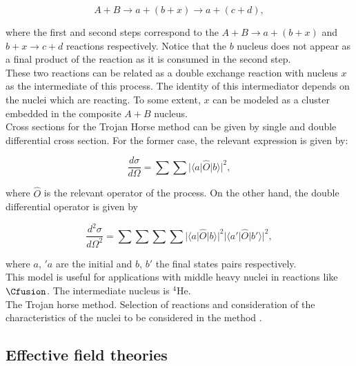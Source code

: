 \documentclass[openany]{book}
\begin{document}
\begin{equation}\label{eq: special_trojanHorse_reaction}
	A + B \rightarrow a + (b + x)\rightarrow a + (c + d),
\end{equation}

where the first and second steps correspond to the $A + B \rightarrow a + (b + x)$ and $b + x \rightarrow c + d$ reactions respectively. Notice that the $b$ nucleus does not appear as a final product of the reaction as it is consumed in the second step. \\

These two reactions can be related as a double exchange reaction with nucleus $x$ as the intermediate of this process. The identity of this intermediator depends on the nuclei which are reacting. To some extent, $x$ can be modeled as a cluster embedded in the composite $A + B$ nucleus. \\ 

Cross sections for the Trojan Horse method can be given by single and double differential cross section. For the former case, the relevant expression is given by: 

\begin{equation}\label{eq: special_differential_single}
	\frac{d\sigma}{d\Omega} = \sum \sum |\langle a | \hat O | b  \rangle|^2,
\end{equation}

where $\hat O$ is the relevant operator of the process. On the other hand, the double differential operator is given by 

\begin{equation}\label{eq: special_differential_double}
	\frac{d^2\sigma}{d\Omega^2} = \sum \sum \sum \sum  |\langle a | \hat O | b \rangle|^2 |\langle a' | \hat O | b' \rangle|^2,
\end{equation}

where $a$, $'a$ are the initial and $b$, $b'$ the final states pairs respectively. \\

This model is useful for applications with middle heavy nuclei in reactions like $\Cfusion$. The intermediate nucleus is $\mathrm{{}^{4}He}$. \\

The Trojan horse method. Selection of reactions and consideration of the characteristics of the nuclei to be considered in the method \cite{spitaleri_mukhamedzhanov_blokhintsev_cognata_pizzone_tumino_2011}.

\subsection{Effective field theories} \label{sub:special_effectiveField}
\end{document}
